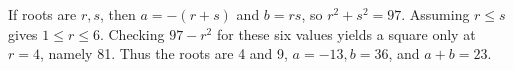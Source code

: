 If roots are $r,s$, then $a=-(r+s)$ and $b=rs$, so $r^2+s^2=97$. Assuming $r\le s$ gives $1\le r\le6$. Checking $97-r^2$ for these six values yields a square only at $r=4$, namely 81. Thus the roots are 4 and 9, $a=-13,b=36$, and $\boxed{a+b=23}$.
